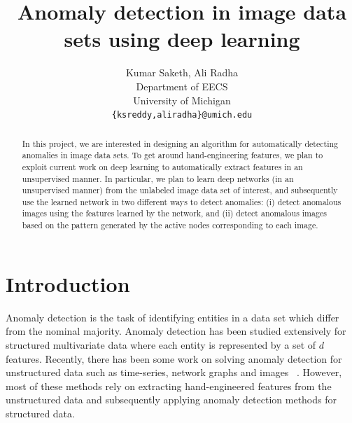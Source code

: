 \documentclass[10pt,twocolumn,letterpaper]{article}
\begin{document}
\title{Anomaly detection in image data sets using deep learning}

\author{Kumar Saketh, Ali Radha\\
Department of EECS\\
University of Michigan\\
{\tt\small \{ksreddy,aliradha\}@umich.edu}
}

\maketitle

\begin{abstract}
In this project, we are interested in designing an algorithm for automatically detecting anomalies in image data sets. To get around hand-engineering features, we plan to exploit current work on deep learning to automatically extract features in an unsupervised manner. In particular, we plan to learn deep networks (in an unsupervised manner) from the unlabeled image data set of interest, and subsequently use the learned network in two different ways to detect anomalies: (i) detect anomalous images using the features learned by the network, and (ii) detect anomalous images based on the pattern generated by the active nodes  corresponding to each image.
\end{abstract}

\section{Introduction}

Anomaly detection is the task of identifying entities in a data set which differ from the nominal majority. Anomaly detection has been studied extensively for structured multivariate data where each entity is represented by a set of $d$ features. Recently, there has been some work on solving anomaly detection for unstructured data such as time-series, network graphs and images~\cite{adsurvey} . However, most of these methods rely on extracting hand-engineered features from the unstructured data and subsequently applying anomaly detection methods for structured data.
\end{document}
